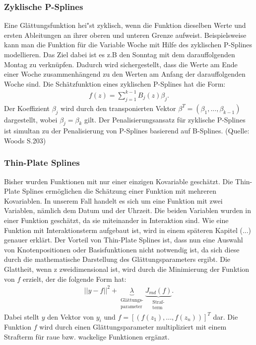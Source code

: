 \subsubsection{Zyklische P-Splines}
Eine Glättungsfunktion hei"st zyklisch, wenn die Funktion dieselben Werte und ersten Ableitungen an ihrer oberen und unteren Grenze aufweist. Beispielsweise kann man die Funktion für die Variable Woche mit Hilfe des zyklischen P-Splines modellieren. Das Ziel dabei ist es z.B den Sonntag mit dem darauffolgenden Montag zu verknüpfen. Dadurch wird sichergestellt, dass die Werte am Ende einer Woche zusammenhängend zu den Werten am Anfang der darauffolgenden Woche sind. 
Die Schätzfunktion eines zyklischen P-Splines hat die Form:
\begin{align}
f(z)=\sum_{j=1}^{k-1}B_{j}(z)\beta_{j}.
\end{align}
Der Koeffizient $\beta_{j}$ wird durch den transponierten Vektor $\beta^T=(\beta_{1},...,\beta_{k-1})$ dargestellt, wobei $\beta_{j}=\beta_{k}$ gilt.
Der Penalisierungsansatz für zyklische P-Splines ist simultan zu der Penalisierung von P-Splines basierend auf B-Splines. (Quelle: Woods S.203)
\subsubsection{Thin-Plate Splines}
Bisher wurden Funktionen mit nur einer einzigen Kovariable geschätzt. Die Thin-Plate Splines ermöglichen die Schätzung einer Funktion mit mehreren Kovariablen. In unserem Fall handelt es sich um eine Funktion mit zwei Variablen, nämlich dem Datum und der Uhrzeit. Die beiden Variablen wurden in einer Funktion geschätzt, da sie miteinander in Interaktion sind. Wie eine Funktion mit Interaktionsterm aufgebaut ist, wird in einem späteren Kapitel (...) genauer erklärt. Der Vorteil von Thin-Plate Splines ist, dass nun eine Auswahl von Knotenpositionen oder Basisfunktionen nicht notwendig ist, da sich diese durch die mathematische Darstellung des Glättungsparameters ergibt. Die Glattheit, wenn z zweidimensional ist,  wird durch die Minimierung der Funktion von $f$ erzielt, der die folgende Form hat:
\begin{align}
||y-f||^2+\underbrace{\lambda}_{\substack{\text{Glättungs-} \\ \text{parameter}}} \underbrace{J_{md}(f)}_{\substack{\text{Straf-} \\ \text{term}}}.
\end{align}
Dabei stellt $y$ den Vektor von $y_{i}$ und $f=[(f(z_{1}),...,f(z_{n}))]^T$ dar. Die Funktion $f$ wird durch einen Glättungsparameter multipliziert mit einem Strafterm für raue bzw. wackelige Funktionen ergänzt.
